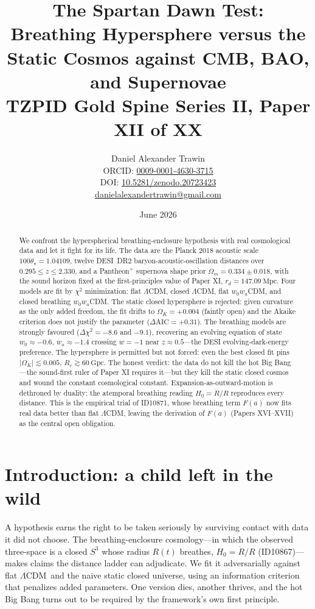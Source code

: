 \documentclass[11pt]{article}
\title{The Spartan Dawn Test:\\ Breathing Hypersphere versus the Static Cosmos against CMB, BAO, and Supernovae\\[0.6em]
\large TZPID Gold Spine Series II, Paper XII of XX}
\author{Daniel Alexander Trawin\\
\small ORCID: \href{https://orcid.org/0009-0001-4630-3715}{0009-0001-4630-3715}\\
\small DOI: \href{https://doi.org/10.5281/zenodo.20723423}{10.5281/zenodo.20723423}\\
\small \href{mailto:danielalexandertrawin@gmail.com}{danielalexandertrawin@gmail.com}}
\date{June 2026}
\theoremstyle{remark}
\newcommand{\LCDM}{$\Lambda$CDM}
\newcommand{\OmK}{\Omega_K}
\newcommand{\Mpc}{\mathrm{Mpc}}
\newcommand{\Gpc}{\mathrm{Gpc}}
\begin{document}
\maketitle
\begin{abstract}
We confront the hyperspherical breathing-enclosure hypothesis with real cosmological data and let it fight for its life. The data are the Planck 2018 acoustic scale $100\theta_\star = 1.04109$, twelve DESI~DR2 baryon-acoustic-oscillation distances over $0.295 \le z \le 2.330$, and a Pantheon$^+$ supernova shape prior $\Omega_m = 0.334 \pm 0.018$, with the sound horizon fixed at the first-principles value of Paper XI, $r_d = 147.09\ \Mpc$. Four models are fit by $\chi^2$ minimization: flat \LCDM, closed \LCDM, flat $w_0w_a$CDM, and closed breathing $w_0w_a$CDM. The static closed hypersphere is rejected: given curvature as the only added freedom, the fit drifts to $\OmK = +0.004$ (faintly open) and the Akaike criterion does not justify the parameter ($\Delta\mathrm{AIC} = +0.31$). The breathing models are strongly favoured ($\Delta\chi^2 = -8.6$ and $-9.1$), recovering an evolving equation of state $w_0 \approx -0.6$, $w_a \approx -1.4$ crossing $w=-1$ near $z \approx 0.5$---the DESI evolving-dark-energy preference. The hypersphere is permitted but not forced: even the best closed fit pins $|\OmK| \lesssim 0.005$, $R_c \gtrsim 60\ \Gpc$. The honest verdict: the data do not kill the hot Big Bang---the sound-first ruler of Paper XI requires it---but they kill the static closed cosmos and wound the constant cosmological constant. Expansion-as-outward-motion is dethroned by duality: the atemporal breathing reading $H_0 = \dot R/R$ reproduces every distance. This is the empirical trial of ID10871, whose breathing term $F(a)$ now fits real data better than flat \LCDM, leaving the derivation of $F(a)$ (Papers XVI--XVII) as the central open obligation.
\end{abstract}
\section{Introduction: a child left in the wild}
A hypothesis earns the right to be taken seriously by surviving contact with data it did not choose. The breathing-enclosure cosmology---in which the observed three-space is a closed $S^3$ whose radius $R(t)$ breathes, $H_0 = \dot R/R$ (ID10867)---makes claims the distance ladder can adjudicate. We fit it adversarially against flat \LCDM\ and the naive static closed universe, using an information criterion that penalizes added parameters. One version dies, another thrives, and the hot Big Bang turns out to be required by the framework's own first principle.
\end{document}
